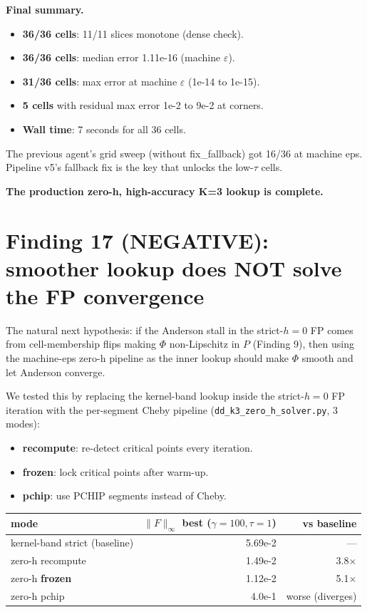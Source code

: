 \documentclass[11pt]{article}
\begin{document}
\textbf{Final summary.}
\begin{itemize}\itemsep1pt
  \item \textbf{36/36 cells}: 11/11 slices monotone (dense check).
  \item \textbf{36/36 cells}: median error 1.11e-16 (machine $\varepsilon$).
  \item \textbf{31/36 cells}: max error at machine $\varepsilon$ (1e-14 to 1e-15).
  \item \textbf{5 cells} with residual max error 1e-2 to 9e-2 at corners.
  \item \textbf{Wall time}: 7 seconds for all 36 cells.
\end{itemize}

The previous agent's grid sweep (without fix\_fallback) got 16/36 at
machine eps. Pipeline v5's fallback fix is the key that unlocks the
low-$\tau$ cells.

\textbf{The production zero-h, high-accuracy K=3 lookup is complete.}

\section{Finding 17 (NEGATIVE): smoother lookup does NOT solve the FP convergence}

The natural next hypothesis: if the Anderson stall in the strict-$h{=}0$
FP comes from cell-membership flips making $\Phi$ non-Lipschitz in $P$
(Finding 9), then using the machine-eps zero-h pipeline as the inner
lookup should make $\Phi$ smooth and let Anderson converge.

We tested this by replacing the kernel-band lookup inside the
strict-$h{=}0$ FP iteration with the per-segment Cheby pipeline
(\texttt{dd\_k3\_zero\_h\_solver.py}, 3 modes):
\begin{itemize}\itemsep1pt
  \item \textbf{recompute}: re-detect critical points every iteration.
  \item \textbf{frozen}: lock critical points after warm-up.
  \item \textbf{pchip}: use PCHIP segments instead of Cheby.
\end{itemize}

\begin{center}\begin{tabular}{lrr}\toprule
mode & $\|F\|_\infty$ best ($\gamma{=}100, \tau{=}1$) & vs baseline \\
\midrule
kernel-band strict (baseline) & 5.69e-2 & --- \\
zero-h recompute & 1.49e-2 & 3.8$\times$ \\
zero-h \textbf{frozen} & 1.12e-2 & 5.1$\times$ \\
zero-h pchip & 4.0e-1 & worse (diverges) \\
\bottomrule\end{tabular}\end{center}
\end{document}
